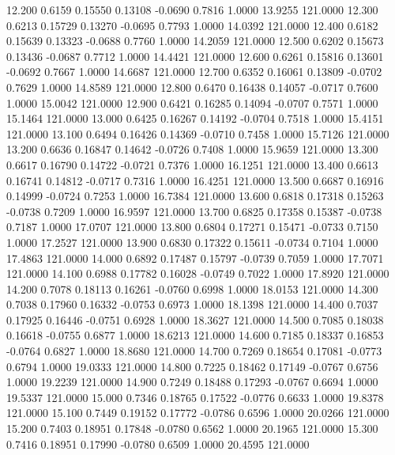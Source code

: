   12.200   0.6159   0.15550   0.13108  -0.0690   0.7816   1.0000  13.9255 121.0000
  12.300   0.6213   0.15729   0.13270  -0.0695   0.7793   1.0000  14.0392 121.0000
  12.400   0.6182   0.15639   0.13323  -0.0688   0.7760   1.0000  14.2059 121.0000
  12.500   0.6202   0.15673   0.13436  -0.0687   0.7712   1.0000  14.4421 121.0000
  12.600   0.6261   0.15816   0.13601  -0.0692   0.7667   1.0000  14.6687 121.0000
  12.700   0.6352   0.16061   0.13809  -0.0702   0.7629   1.0000  14.8589 121.0000
  12.800   0.6470   0.16438   0.14057  -0.0717   0.7600   1.0000  15.0042 121.0000
  12.900   0.6421   0.16285   0.14094  -0.0707   0.7571   1.0000  15.1464 121.0000
  13.000   0.6425   0.16267   0.14192  -0.0704   0.7518   1.0000  15.4151 121.0000
  13.100   0.6494   0.16426   0.14369  -0.0710   0.7458   1.0000  15.7126 121.0000
  13.200   0.6636   0.16847   0.14642  -0.0726   0.7408   1.0000  15.9659 121.0000
  13.300   0.6617   0.16790   0.14722  -0.0721   0.7376   1.0000  16.1251 121.0000
  13.400   0.6613   0.16741   0.14812  -0.0717   0.7316   1.0000  16.4251 121.0000
  13.500   0.6687   0.16916   0.14999  -0.0724   0.7253   1.0000  16.7384 121.0000
  13.600   0.6818   0.17318   0.15263  -0.0738   0.7209   1.0000  16.9597 121.0000
  13.700   0.6825   0.17358   0.15387  -0.0738   0.7187   1.0000  17.0707 121.0000
  13.800   0.6804   0.17271   0.15471  -0.0733   0.7150   1.0000  17.2527 121.0000
  13.900   0.6830   0.17322   0.15611  -0.0734   0.7104   1.0000  17.4863 121.0000
  14.000   0.6892   0.17487   0.15797  -0.0739   0.7059   1.0000  17.7071 121.0000
  14.100   0.6988   0.17782   0.16028  -0.0749   0.7022   1.0000  17.8920 121.0000
  14.200   0.7078   0.18113   0.16261  -0.0760   0.6998   1.0000  18.0153 121.0000
  14.300   0.7038   0.17960   0.16332  -0.0753   0.6973   1.0000  18.1398 121.0000
  14.400   0.7037   0.17925   0.16446  -0.0751   0.6928   1.0000  18.3627 121.0000
  14.500   0.7085   0.18038   0.16618  -0.0755   0.6877   1.0000  18.6213 121.0000
  14.600   0.7185   0.18337   0.16853  -0.0764   0.6827   1.0000  18.8680 121.0000
  14.700   0.7269   0.18654   0.17081  -0.0773   0.6794   1.0000  19.0333 121.0000
  14.800   0.7225   0.18462   0.17149  -0.0767   0.6756   1.0000  19.2239 121.0000
  14.900   0.7249   0.18488   0.17293  -0.0767   0.6694   1.0000  19.5337 121.0000
  15.000   0.7346   0.18765   0.17522  -0.0776   0.6633   1.0000  19.8378 121.0000
  15.100   0.7449   0.19152   0.17772  -0.0786   0.6596   1.0000  20.0266 121.0000
  15.200   0.7403   0.18951   0.17848  -0.0780   0.6562   1.0000  20.1965 121.0000
  15.300   0.7416   0.18951   0.17990  -0.0780   0.6509   1.0000  20.4595 121.0000
